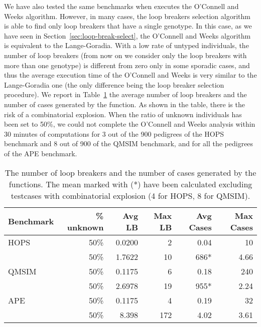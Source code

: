 We have also tested the same benchmarks when {} executes the O'Connell and
Weeks algorithm. However, in many cases, the loop breakers selection algorithm
is able to find only loop breakers that have a single genotype. In this case, as
we have seen in Section~\ref{sec:loop-break-select}, the O'Connell and Weeks
algorithm is equivalent to the Lange-Goradia. With a low rate of untyped
individuals, the number of loop breakers (from now on we consider only the loop
breakers with more than one genotype) is different from zero only in some
sporadic cases, and thus the average execution time of the O'Connell and Weeks
is very similar to the Lange-Goradia one (the only difference being the loop
breaker selection procedure). We report in Table~\ref{tab:avglb} the average
number of loop breakers and the number of cases generated by the 
function. As shown in the table, there is the risk of a combinatorial
explosion. When the ratio of unknown individuals has been set to 50\%, we could
not complete the O'Connell and Weeks analysis within 30 minutes of computations
for 3 out of the 900 pedigrees of the HOPS benchmark and 8 out of 900 of the
QMSIM benchmark, and for all the pedigrees of the APE benchmark. 

\begin{table}
  \centering
  \begin{tabular}{lrrrrr}
    \textbf{Benchmark}&\textbf{\% unknown}&\textbf{Avg LB}&\textbf{Max
      LB}&\textbf{Avg Cases}&\textbf{Max Cases}\\\hline 
    HOPS   & 50\% & 0.0200 & 2   & 0.04                & 10                   \\
           & 50\%    & 1.7622 & 10  & 686*                & 4.66     \\\hline
    QMSIM & 50\% & 0.1175 & 6   & 0.18                & 240                  \\
           & 50\%    & 2.6978 & 19  & 955*                & 2.24     \\\hline
    APE    & 50\% & 0.1175 & 4   & 0.19                & 32                   \\
           & 50\%    & 8.398  & 172 & 4.02 & 3.61  \\\hline
  \end{tabular}
  \caption{The number of loop breakers and the number of cases generated by the
     functions. The mean marked with (*) have been calculated
    excluding testcases with combinatorial explosion (4 for HOPS, 8 for QMSIM).}
\label{tab:avglb}
\end{table}

